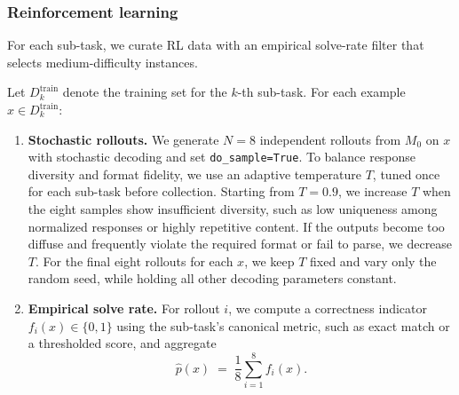 \subsubsection{Reinforcement learning}
For each sub-task, we curate RL data with an empirical solve-rate filter that selects medium-difficulty
  instances.

  Let \(D^{\text{train}}_{k}\) denote the training set for the \(k\)-th sub-task. For each example \(x \in
  D^{\text{train}}_{k}\):
  \begin{enumerate}
      \item \textbf{Stochastic rollouts.} We generate \(N=8\) independent rollouts from \(M_0\) on \(x\) with stochastic decoding and set \texttt{do\_sample=True}. To balance response diversity and format fidelity, we use an adaptive temperature \(T\), tuned once for each sub-task before collection. Starting from \(T=0.9\), we increase \(T\) when the eight samples show insufficient diversity, such
      as low uniqueness among normalized responses or highly repetitive content. If the outputs become too diffuse and frequently violate the required format or fail to parse, we decrease \(T\). For the final eight rollouts for each \(x\), we keep \(T\) fixed and vary only the random seed, while holding all other decoding parameters constant.

      \item \textbf{Empirical solve rate.} For rollout \(i\), we compute a correctness indicator \(f_i(x)\in\{0,1\}\) using the sub-task's canonical metric, such as exact match or a thresholded score, and aggregate
      \begin{equation}
          \hat p(x) \;=\; \frac{1}{8}\sum_{i=1}^{8} f_i(x).
      \end{equation}


\end{enumerate}
